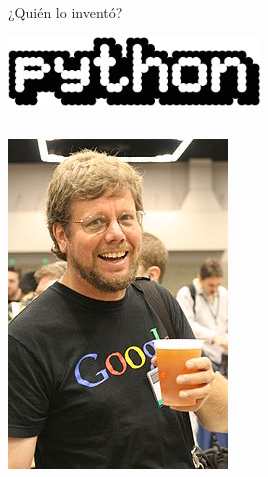 \documentclass[bigger,unknownkeysallowed]{beamer}
\begin{document}
\begin{frame}[label={sec:org84a683a}]{¿Quién lo inventó?}
\begin{center}
\begin{center}
\includegraphics[width=0.5\textwidth]{PythonProgLogo.png}
\end{center}
\end{center}

\begin{columns}
\begin{column}{0.3\columnwidth}
\begin{center}
\includegraphics[width=\textwidth]{guido.jpg}
\end{center}
\end{column}


\end{columns}
\end{frame}
\end{document}
